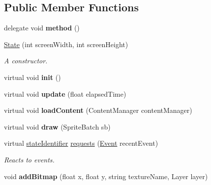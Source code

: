 \subsection*{Public Member Functions}
\begin{DoxyCompactItemize}
\item 
\hypertarget{classwp__engine_1_1_state_a6751338962e6da93c8b9afc859df9762}{delegate void {\bfseries method} ()}\label{classwp__engine_1_1_state_a6751338962e6da93c8b9afc859df9762}

\item 
\hyperlink{classwp__engine_1_1_state_a7b0929ccee00bfae0591b4f2d5bb57a7}{State} (int screen\-Width, int screen\-Height)
\begin{DoxyCompactList}\small\item\em A constructor. \end{DoxyCompactList}\item 
\hypertarget{classwp__engine_1_1_state_a3aac3b299c00af7ba2c91b65b873dcfc}{virtual void {\bfseries init} ()}\label{classwp__engine_1_1_state_a3aac3b299c00af7ba2c91b65b873dcfc}

\item 
\hypertarget{classwp__engine_1_1_state_a13c88b5362a424a22b8b66deae2695d5}{virtual void {\bfseries update} (float elapsed\-Time)}\label{classwp__engine_1_1_state_a13c88b5362a424a22b8b66deae2695d5}

\item 
\hypertarget{classwp__engine_1_1_state_aacb9e5cd0e6eebe165029d8410c04855}{virtual void {\bfseries load\-Content} (Content\-Manager content\-Manager)}\label{classwp__engine_1_1_state_aacb9e5cd0e6eebe165029d8410c04855}

\item 
\hypertarget{classwp__engine_1_1_state_a54cd59a5cefff596966c18d4b66f942b}{virtual void {\bfseries draw} (Sprite\-Batch sb)}\label{classwp__engine_1_1_state_a54cd59a5cefff596966c18d4b66f942b}

\item 
virtual \hyperlink{namespacewp__engine_aae123481cdcc6dc4c4474c1b0b62b152}{state\-Identifier} \hyperlink{classwp__engine_1_1_state_a9373a9a657364683fa648f655bc323a7}{requests} (\hyperlink{classwp__engine_1_1_event}{Event} recent\-Event)
\begin{DoxyCompactList}\small\item\em Reacts to events. \end{DoxyCompactList}\item 
\hypertarget{classwp__engine_1_1_state_a9b58df33e71d1f9d8fbe3b6521ce9b93}{void {\bfseries add\-Bitmap} (float x, float y, string texture\-Name, Layer layer)}\label{classwp__engine_1_1_state_a9b58df33e71d1f9d8fbe3b6521ce9b93}


\end{DoxyCompactItemize}
